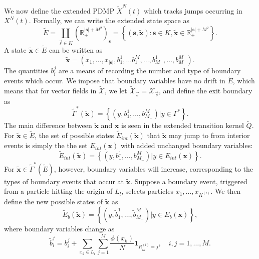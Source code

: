  
We now define the extended PDMP $\tilde X^{N}(t)$ which tracks jumps occurring in $X^{N}(t)$.   Formally, we can write the extended state space as 
\begin{equation}
\tilde E = \coprod_{\vec s \in K } (\mathbb{R}^{|\mathbf s|+M^2}_+)_\mathbf s = \left\{(\mathbf s,\tilde{\mathbf x}):\mathbf s \in K, \tilde{\mathbf x} \in \mathbb{R}_+^{|\mathbf s| + M^2}\right\}. 
\end{equation}
A state $\tilde {\textbf{x}} \in \tilde E$ can be written as 
\begin{equation}
\tilde {\textbf{x}} = \left(x_1, \dots, x_{|\mathbf s|},b_{1}^1, \dots b_1^M, \dots, b_{M_-}^1, \dots, b_{M_-}^M\right).
\end{equation} 
The quantities $b_i^j$ are a means of recording the number and type of boundary events which occur.  We impose that boundary variables have no drift in $\tilde E$, which means that for vector fields in $\tilde{ \mathcal X}$, we let $\tilde{\mathcal X}_{\vec s}= \mathcal X_{\vec s}$, and define the exit boundary as
\begin{equation}
\tilde \Gamma^*(\tilde {\textbf{x}}) = \left\{(y, b_1^1, \dots, b_{M_-}^M)| y \in \Gamma^*\right \}.
\end{equation}
The main difference between $\tilde{\textbf{x}}$ and $\textbf{x}$ is seen in the extended transition kernel $\tilde Q$. For $\tilde {\textbf{x}}\in \tilde E$, the set of possible states  $\tilde E_{int}(\tilde {\textbf{x}})$ that $\tilde {\textbf{x}}$ may jump to from interior events is simply the the set $E_{int}(\textbf{x})$ with added unchanged boundary variables:
\begin{equation}
\tilde E_{int}(\tilde {\textbf{x}})  = \left\{(y, b_1^1,\dots, b_{M_-}^M)| y \in E_{int}(\textbf{x})\right\}.
\end{equation}
For $\tilde {\textbf{x}} \in \tilde \Gamma^*(\tilde E)$, however, boundary variables will increase, corresponding to the types of boundary events that occur at $\tilde{\mathbf x}$. Suppose a boundary event, triggered from a particle hitting the origin of $L_l$, selects particles $x_1, \dots, x_{K^{(l)}}$. We then define the new possible states of $\tilde {\textbf{x}}$ as 
\begin{equation}
\tilde E_b(\tilde {\textbf{x}})  = \left\{(y, \tilde b_1^1,\dots,\tilde  b_{M_-}^M)| y \in E_b(\textbf{x})\right\},
\end{equation}
where boundary variables change as 
\begin{equation}
\tilde b_i^j =  b_i^j+ \sum_{x_k\in L_i}\sum_{j = 1}^M \frac{\phi (x_k)}{N}\textbf{1}_{R^{(l)}_{ik} =j}, \quad i,j = 1, \dots, M . \end{equation}
